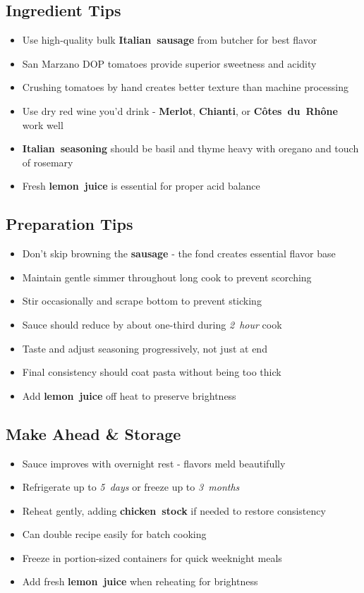 \documentclass[11pt,letterpaper]{article}
\begin{document}
{\begin{multicols}{2}
\subsection*{Ingredient Tips}
\begin{itemize}
    \item Use high-quality bulk \textbf{Italian~sausage} from butcher for best flavor
    \item San Marzano DOP tomatoes provide superior sweetness and acidity
    \item Crushing tomatoes by hand creates better texture than machine processing
    \item Use dry red wine you'd drink - \textbf{Merlot}, \textbf{Chianti}, or \textbf{Côtes~du~Rhône} work well
    \item \textbf{Italian~seasoning} should be basil and thyme heavy with oregano and touch of rosemary
    \item Fresh \textbf{lemon~juice} is essential for proper acid balance
\end{itemize}

\subsection*{Preparation Tips}
\begin{itemize}
    \item Don't skip browning the \textbf{sausage} - the fond creates essential flavor base
    \item Maintain gentle simmer throughout long cook to prevent scorching
    \item Stir occasionally and scrape bottom to prevent sticking
    \item Sauce should reduce by about one-third during \textit{2~hour} cook
    \item Taste and adjust seasoning progressively, not just at end
    \item Final consistency should coat pasta without being too thick
    \item Add \textbf{lemon~juice} off heat to preserve brightness
\end{itemize}

\subsection*{Make Ahead \& Storage}
\begin{itemize}
    \item Sauce improves with overnight rest - flavors meld beautifully
    \item Refrigerate up to \textit{5~days} or freeze up to \textit{3~months}
    \item Reheat gently, adding \textbf{chicken~stock} if needed to restore consistency
    \item Can double recipe easily for batch cooking
    \item Freeze in portion-sized containers for quick weeknight meals
    \item Add fresh \textbf{lemon~juice} when reheating for brightness
\end{itemize}


\end{multicols}}
\end{document}
